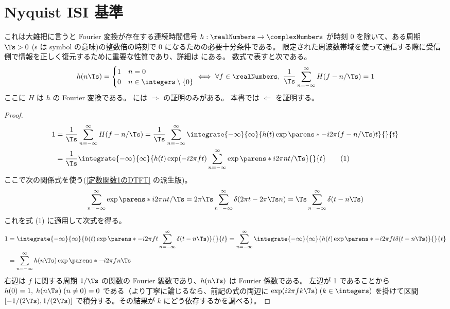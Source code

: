     \section{Nyquist ISI 基準}
        これは大雑把に言うと Fourier 変換が存在する連続時間信号 $h:\realNumbers\to\complexNumbers$ が時刻 0 を除いて、ある周期 $\Ts>0$ (s は symbol の意味)の整数倍の時刻で 0 になるための必要十分条件である。
        限定された周波数帯域を使って通信する際に受信側で情報を正しく復元するために重要な性質であり、詳細は \cite{Nyquist_ISI_crit} にある。
        数式で表すと次である。
        \[
            h(n\Ts) = \begin{cases}
                1 & n=0 \\
                0 & n\in\integers\setminus\{0\}
            \end{cases}
            \iff \forall f\in\realNumbers,\;\frac{1}{\Ts}\sum_{n=-\infty}^\infty H(f-n/\Ts) = 1
        \]
        ここに $H$ は $h$ の Fourier 変換である。
        \cite{Nyquist_ISI_crit} には $\Rightarrow$ の証明のみがある。
        本書では $\Leftarrow$ を証明する。
        \begin{proof}
            \begin{align*}
                1 &= \frac{1}{\Ts}\sum_{n=-\infty}^\infty H(f-n/\Ts) = \frac{1}{\Ts}\sum_{n=-\infty}^\infty\integrate{-\infty}{\infty}{h(t)\exp\parens*{-i2\pi(f-n/\Ts)t}}{}{t} \\
                &= \frac{1}{\Ts}\integrate{-\infty}{\infty}{h(t)\exp(-i2\pi ft)\sum_{n=-\infty}^\infty\exp\parens*{i2\pi nt/\Ts}}{}{t} \tag{1}
            \end{align*}
            ここで次の関係式を使う(\ref{定数関数1のDTFT} の派生版)。
            \[ \sum_{n=-\infty}^\infty\exp\parens*{i2\pi nt/\Ts} = 2\pi\Ts\sum_{n=-\infty}^\infty\delta(2\pi t-2\pi\Ts n) = \Ts\sum_{n=-\infty}^\infty\delta(t-n\Ts) \]
            これを式 (1) に適用して次式を得る。
            \begin{align*}
                1 &= \integrate{-\infty}{\infty}{h(t)\exp\parens*{-i2\pi ft}\sum_{n=-\infty}^\infty\delta(t-n\Ts)}{}{t} = \sum_{n=-\infty}^\infty\integrate{-\infty}{\infty}{h(t)\exp\parens*{-i2\pi ft}\delta(t-n\Ts)}{}{t} \\
                &= \sum_{n=-\infty}^\infty h(n\Ts)\exp\parens*{-i2\pi fn\Ts}
            \end{align*}
            右辺は $f$ に関する周期 $1/\Ts$ の関数の Fourier 級数であり、$h(n\Ts)$ は Fourier 係数である。
            左辺が 1 であることから $h(0) = 1,\;h(n\Ts)\;(n\neq 0) = 0$ である（より丁寧に論じるなら、前記の式の両辺に $\exp(i2\pi fk\Ts)\;(k\in\integers)$ を掛けて区間 $[-1/(2\Ts),1/(2\Ts)]$ で積分する。その結果が $k$ にどう依存するかを調べる）。
        \end{proof}
